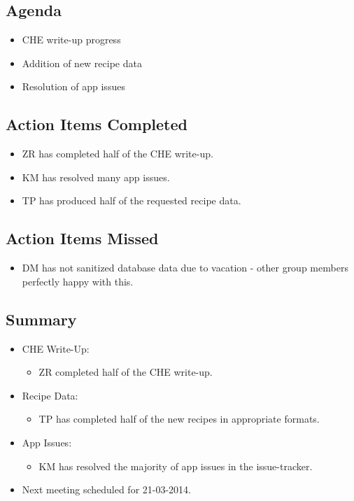 \documentclass{article}
\begin{document}
\subsection*{Agenda}
\begin{itemize}
\item CHE write-up progress
\item Addition of new recipe data
\item Resolution of app issues
\end{itemize}

\subsection*{Action Items Completed}
\begin{itemize}
\item ZR has completed half of the CHE write-up.
\item KM has resolved many app issues.
\item TP has produced half of the requested recipe data.
\end{itemize}

\subsection*{Action Items Missed}
\begin{itemize}
\item DM has not sanitized database data due to vacation - other group members perfectly happy with this.
\end{itemize}

\subsection*{Summary}
\begin{itemize}
\item CHE Write-Up:
  \begin{itemize}
  \item ZR completed half of the CHE write-up.
  \end{itemize}
\item Recipe Data:
  \begin{itemize}
  \item TP has completed half of the new recipes in appropriate formats.
  \end{itemize}
\item App Issues:
  \begin{itemize}
  \item KM has resolved the majority of app issues in the issue-tracker.
  \end{itemize}
\item Next meeting scheduled for 21-03-2014.
\end{itemize}
\end{document}
